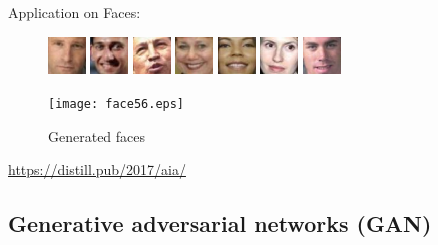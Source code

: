 \documentclass[english]{article}
\begin{document}

\item 

Application on Faces:
\begin{figure}[H]\centering
\includegraphics[width=1cm]{face2.eps}
\includegraphics[width=1cm]{face150.eps}
\includegraphics[width=1cm]{face268.eps}
\includegraphics[width=1cm]{face700.eps}
\includegraphics[width=1cm]{face990.eps}
\includegraphics[width=1cm]{face1004.eps}
\includegraphics[width=1cm]{face1354.eps}
\end{figure}

\begin{figure}[H]\centering
\texttt{[image: face56.eps]}
\caption{Generated faces}
\end{figure}



\url{https://distill.pub/2017/aia/}




\eenum 

 
\subsection{Generative adversarial networks (GAN)}
\end{document}
